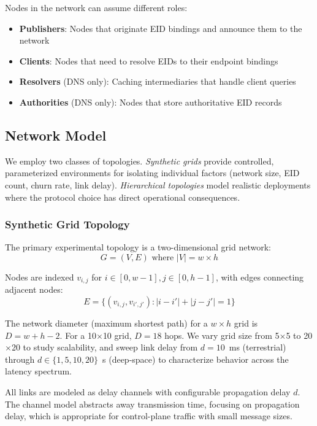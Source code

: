 \documentclass[journal,twocolumn]{IEEEtran}
\begin{document}
Nodes in the network can assume different roles:
\begin{itemize}
    \item \textbf{Publishers}: Nodes that originate EID bindings and announce them to the network
    \item \textbf{Clients}: Nodes that need to resolve EIDs to their endpoint bindings
    \item \textbf{Resolvers} (DNS only): Caching intermediaries that handle client queries
    \item \textbf{Authorities} (DNS only): Nodes that store authoritative EID records
\end{itemize}

\subsection{Network Model}
\label{sec_network_model}

We employ two classes of topologies. 
\emph{Synthetic grids} provide controlled, parameterized environments for isolating individual factors (network size, EID count, churn rate, link delay). 
\emph{Hierarchical topologies} model realistic deployments where the protocol choice has direct operational consequences.

\subsubsection{Synthetic Grid Topology}

The primary experimental topology is a two-dimensional grid network:
\begin{equation}
G = (V, E) \text{ where } |V| = w \times h
\end{equation}

Nodes are indexed $v_{i,j}$ for $i \in [0, w-1], j \in [0, h-1]$, with edges connecting adjacent nodes:
\begin{equation}
E = \{(v_{i,j}, v_{i',j'}) : |i-i'| + |j-j'| = 1\}
\end{equation}

The network diameter (maximum shortest path) for a $w \times h$ grid is $D = w + h - 2$. 
For a 10$\times$10 grid, $D = 18$ hops. 
We vary grid size from 5$\times$5 to 20$\times$20 to study scalability, and sweep link delay from $d = 10$~ms (terrestrial) through $d \in \{1, 5, 10, 20\}$~s (deep-space) to characterize behavior across the latency spectrum.

All links are modeled as delay channels with configurable propagation delay $d$. 
The channel model abstracts away transmission time, focusing on propagation delay, which is appropriate for control-plane traffic with small message sizes.
\end{document}
